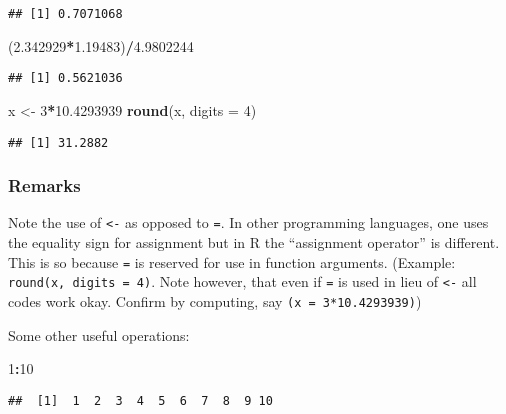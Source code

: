 \documentclass[11pt,]{article}
\newenvironment{Shaded}{\begin{snugshade}}{\end{snugshade}}
\newcommand{\KeywordTok}[1]{\textcolor[rgb]{0.13,0.29,0.53}{\textbf{#1}}}
\newcommand{\DataTypeTok}[1]{\textcolor[rgb]{0.13,0.29,0.53}{#1}}
\newcommand{\DecValTok}[1]{\textcolor[rgb]{0.00,0.00,0.81}{#1}}
\newcommand{\FloatTok}[1]{\textcolor[rgb]{0.00,0.00,0.81}{#1}}
\newcommand{\StringTok}[1]{\textcolor[rgb]{0.31,0.60,0.02}{#1}}
\newcommand{\OperatorTok}[1]{\textcolor[rgb]{0.81,0.36,0.00}{\textbf{#1}}}
\newcommand{\NormalTok}[1]{#1}
\begin{document}
\begin{verbatim}
## [1] 0.7071068
\end{verbatim}

\begin{Shaded}
\begin{Highlighting}[]
\NormalTok{(}\FloatTok{2.342929}\OperatorTok{*}\FloatTok{1.19483}\NormalTok{)}\OperatorTok{/}\FloatTok{4.9802244}
\end{Highlighting}
\end{Shaded}

\begin{verbatim}
## [1] 0.5621036
\end{verbatim}

\begin{Shaded}
\begin{Highlighting}[]
\NormalTok{x <-}\StringTok{ }\DecValTok{3}\OperatorTok{*}\FloatTok{10.4293939}
\KeywordTok{round}\NormalTok{(x, }\DataTypeTok{digits =} \DecValTok{4}\NormalTok{)}
\end{Highlighting}
\end{Shaded}

\begin{verbatim}
## [1] 31.2882
\end{verbatim}

\subsubsection{Remarks}\label{remarks}

Note the use of \texttt{\textless{}-} as opposed to \texttt{=}. In other
programming languages, one uses the equality sign for assignment but in
R the ``assignment operator'' is different. This is so because
\texttt{=} is reserved for use in function arguments. (Example:
\texttt{round(x,\ digits\ =\ 4)}. Note however, that even if \texttt{=}
is used in lieu of \texttt{\textless{}-} all codes work okay. Confirm by
computing, say \texttt{(x\ =\ 3*10.4293939)})

Some other useful operations:

\begin{Shaded}
\begin{Highlighting}[]
\DecValTok{1}\OperatorTok{:}\DecValTok{10}
\end{Highlighting}
\end{Shaded}

\begin{verbatim}
##  [1]  1  2  3  4  5  6  7  8  9 10
\end{verbatim}
\end{document}
